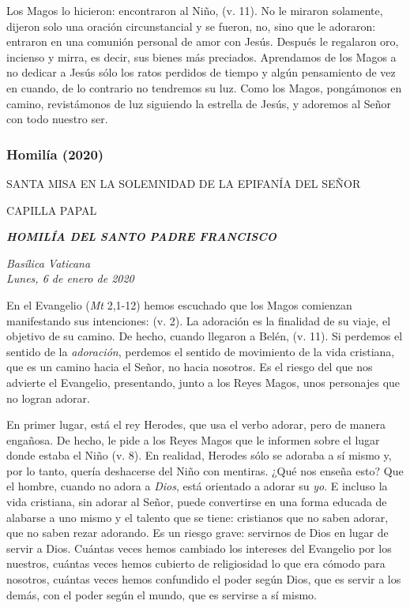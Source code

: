 {Los Magos lo hicieron: encontraron al Niño,  (v. 11). No le miraron solamente, dijeron solo una oración circunstancial y se fueron, no, sino que le adoraron: entraron en una comunión personal de amor con Jesús. Después le regalaron oro, incienso y mirra, es decir, sus bienes más preciados. Aprendamos de los Magos a no dedicar a Jesús sólo los ratos perdidos de tiempo y algún pensamiento de vez en cuando, de lo contrario no tendremos su luz. Como los Magos, pongámonos en camino, revistámonos de luz siguiendo la estrella de Jesús, y adoremos al Señor con todo nuestro ser.

\subsubsection{Homilía (2020)} {SANTA MISA EN LA SOLEMNIDAD DE LA EPIFANÍA DEL SEÑOR}

CAPILLA PAPAL

\textbf{\emph{HOMILÍA DEL SANTO PADRE FRANCISCO}}

\emph{Basílica Vaticana\\ Lunes, 6 de enero de 2020}



En el Evangelio (\emph{Mt} 2,1-12) hemos escuchado que los Magos comienzan manifestando sus intenciones:  (v. 2). La adoración es la finalidad de su viaje, el objetivo de su camino. De hecho, cuando llegaron a Belén,  (v. 11). Si perdemos el sentido de la \emph{adoración}, perdemos el sentido de movimiento de la vida cristiana, que es un camino hacia el Señor, no hacia nosotros. Es el riesgo del que nos advierte el Evangelio, presentando, junto a los Reyes Magos, unos personajes que no logran adorar.

En primer lugar, está el rey Herodes, que usa el verbo adorar, pero de manera engañosa. De hecho, le pide a los Reyes Magos que le informen sobre el lugar donde estaba el Niño  (v. 8). En realidad, Herodes sólo se adoraba a sí mismo y, por lo tanto, quería deshacerse del Niño con mentiras. ¿Qué nos enseña esto? Que el hombre, cuando no adora a \emph{Dios}, está orientado a adorar su \emph{yo}. E incluso la vida cristiana, sin adorar al Señor, puede convertirse en una forma educada de alabarse a uno mismo y el talento que se tiene: cristianos que no saben adorar, que no saben rezar adorando. Es un riesgo grave: servirnos de Dios en lugar de servir a Dios. Cuántas veces hemos cambiado los intereses del Evangelio por los nuestros, cuántas veces hemos cubierto de religiosidad lo que era cómodo para nosotros, cuántas veces hemos confundido el poder según Dios, que es servir a los demás, con el poder según el mundo, que es servirse a sí mismo.

}
